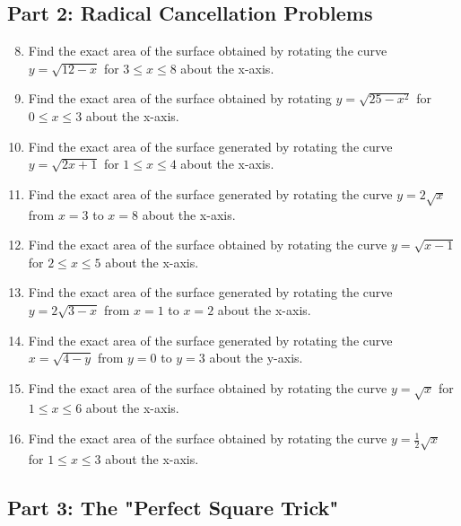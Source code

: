 \documentclass[12pt]{article}
\begin{document}
\subsection*{Part 2: Radical Cancellation Problems}

\begin{enumerate}
    \setcounter{enumi}{7}
    \item Find the exact area of the surface obtained by rotating the curve $y = \sqrt{12-x}$ for $3 \le x \le 8$ about the x-axis.

    \item Find the exact area of the surface obtained by rotating $y = \sqrt{25-x^2}$ for $0 \le x \le 3$ about the x-axis.

    \item Find the exact area of the surface generated by rotating the curve $y = \sqrt{2x+1}$ for $1 \le x \le 4$ about the x-axis.

    \item Find the exact area of the surface generated by rotating the curve $y=2\sqrt{x}$ from $x=3$ to $x=8$ about the x-axis.
    
    \item Find the exact area of the surface obtained by rotating the curve $y = \sqrt{x-1}$ for $2 \le x \le 5$ about the x-axis.
    
    \item Find the exact area of the surface generated by rotating the curve $y=2\sqrt{3-x}$ from $x=1$ to $x=2$ about the x-axis.
    
    \item Find the exact area of the surface generated by rotating the curve $x=\sqrt{4-y}$ from $y=0$ to $y=3$ about the y-axis.
    
    \item Find the exact area of the surface obtained by rotating the curve $y=\sqrt{x}$ for $1 \le x \le 6$ about the x-axis.
    
    \item Find the exact area of the surface obtained by rotating the curve $y=\frac{1}{2}\sqrt{x}$ for $1 \le x \le 3$ about the x-axis.

\end{enumerate}


\subsection*{Part 3: The "Perfect Square Trick"}
\end{document}
